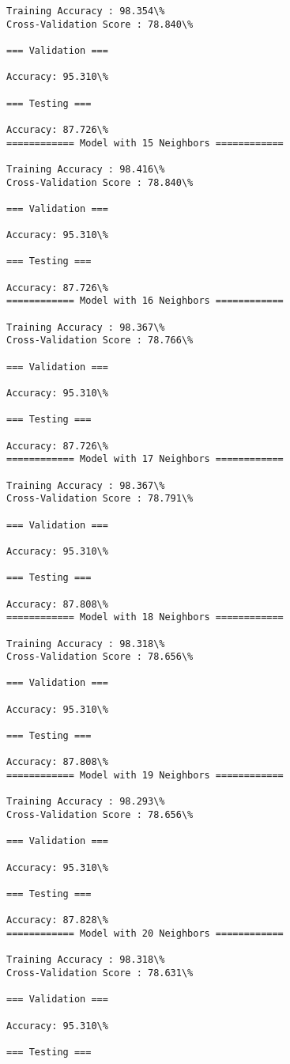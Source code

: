 \documentclass[11pt]{article}
\begin{document}
\begin{Verbatim}[commandchars=\\\{\}]
Training Accuracy : 98.354\%
Cross-Validation Score : 78.840\%

=== Validation ===

Accuracy: 95.310\%

=== Testing ===

Accuracy: 87.726\%
============ Model with 15 Neighbors ============

Training Accuracy : 98.416\%
Cross-Validation Score : 78.840\%

=== Validation ===

Accuracy: 95.310\%

=== Testing ===

Accuracy: 87.726\%
============ Model with 16 Neighbors ============

Training Accuracy : 98.367\%
Cross-Validation Score : 78.766\%

=== Validation ===

Accuracy: 95.310\%

=== Testing ===

Accuracy: 87.726\%
============ Model with 17 Neighbors ============

Training Accuracy : 98.367\%
Cross-Validation Score : 78.791\%

=== Validation ===

Accuracy: 95.310\%

=== Testing ===

Accuracy: 87.808\%
============ Model with 18 Neighbors ============

Training Accuracy : 98.318\%
Cross-Validation Score : 78.656\%

=== Validation ===

Accuracy: 95.310\%

=== Testing ===

Accuracy: 87.808\%
============ Model with 19 Neighbors ============

Training Accuracy : 98.293\%
Cross-Validation Score : 78.656\%

=== Validation ===

Accuracy: 95.310\%

=== Testing ===

Accuracy: 87.828\%
============ Model with 20 Neighbors ============

Training Accuracy : 98.318\%
Cross-Validation Score : 78.631\%

=== Validation ===

Accuracy: 95.310\%

=== Testing ===


\end{Verbatim}
\end{document}
